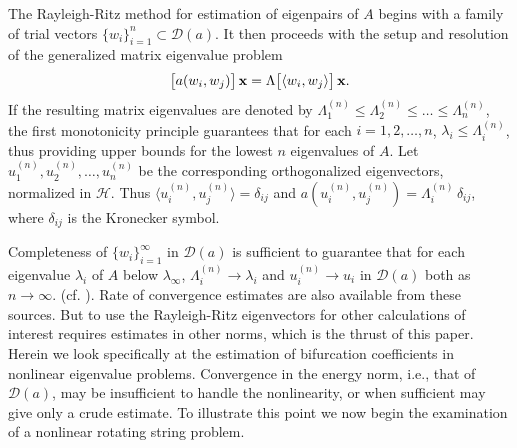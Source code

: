 \documentclass[final]{siamltex}
\numberwithin{equation}{section}
\begin{document}
The Rayleigh-Ritz method for estimation of eigenpairs of $A$ begins with a family of trial vectors $\{w_i\}_{i=1}^{n} \subset \mathcal{D}(a)$. It then proceeds with the setup and resolution of the generalized matrix eigenvalue problem
\begin{equation} \notag
\big[a(w_i, w_j) \big] \, {\bf x} =\Lambda \big[\langle w_i, w_j \rangle\big] \, {\bf x}.
\end{equation}
If the resulting matrix eigenvalues are denoted by $\Lambda_1^{(n)} \le \Lambda_2^{(n)} \le \ldots \le \Lambda_n^{(n)}$, the first monotonicity principle \cite{Weinberger-SIAM} guarantees that for each $i=1, 2, \ldots, n$, $\lambda_i \le \Lambda_i^{(n)}$, thus providing upper bounds for the lowest $n$ eigenvalues of $A$. Let $u_1^{(n)}, u_2^{(n)}, \ldots, u_n^{(n)}$ be the corresponding orthogonalized eigenvectors, normalized in $\mathcal{H}$. Thus $\langle u_i^{(n)}, u_j^{(n)}\rangle= \delta_{ij}$ and
$a(u_i^{(n)}, u_j^{(n)}) = \Lambda_i^{(n)} \, \delta_{ij}$, where $\delta_{ij}$ is the Kronecker symbol.

Completeness of $\{w_i\}_{i=1}^{\infty}$ in $\mathcal{D}(a)$ is sufficient to guarantee that for each eigenvalue $\lambda_i$ of $A$ below $\lambda_{\infty}$, $\Lambda_i^{(n)} \to \lambda_i$ and $u_i^{(n)} \to u_i$ in $\mathcal{D}(a)$ both as $n\to \infty$. (cf. \cite{Babuska-Osborn} \cite{Chatelin} \cite{Weinberger-SIAM}). Rate of convergence estimates are also available from these sources. But to use the Rayleigh-Ritz eigenvectors for other calculations of interest requires estimates in other norms, which is the thrust of this paper. Herein we look specifically at the estimation of bifurcation coefficients in nonlinear eigenvalue problems. Convergence in the energy norm, i.e., that of $\mathcal{D}(a)$, may be insufficient to handle the nonlinearity, or when sufficient may give only a crude estimate. To illustrate this point we now begin the examination of a nonlinear rotating string problem.
\end{document}
